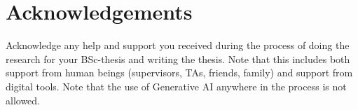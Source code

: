 \chapter*{Acknowledgements}\label{acknowledgements}
Acknowledge any help and support you received during the process of doing the research for your BSc-thesis and writing the thesis. Note that this includes both support from human beings (supervisors, TAs, friends, family) and support from digital tools. Note that the use of Generative AI anywhere in the process is not allowed.